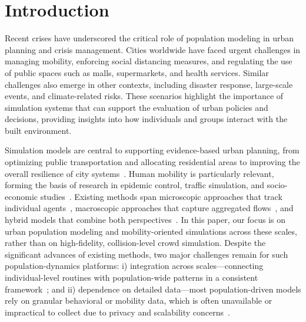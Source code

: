 \documentclass[pdflatex,sn-mathphys-num]{sn-jnl}%
\newcommand\redb[1]{#1}
\theoremstyle{thmstyleone}%
\theoremstyle{thmstyletwo}%
\theoremstyle{thmstylethree}%
\begin{document}
\section{Introduction}
\label{sec:introduction}

Recent crises have underscored the critical role of population modeling in urban planning and crisis management. Cities worldwide have faced urgent challenges in managing mobility, enforcing social distancing measures, and regulating the use of public spaces such as malls, supermarkets, and health services\citep{shafiri2020covidImpact, kang2021hybridCovid, bouchnita2021mathModelCovid}. Similar challenges also emerge in other contexts, including disaster response, large-scale events, and climate-related risks\citep{eid1980, tekouabou2022MLinUrbanPlanning, haraguchi2022mobilityDataReview, serana2023multilevelmodeling}. These scenarios highlight the importance of simulation systems that can \redb{support the evaluation of urban policies and decisions}, providing insights into how individuals and groups interact with the built
environment\citep{kang2021hybridCovid, tekouabou2022MLinUrbanPlanning}.

Simulation models are central to supporting evidence-based urban planning, from optimizing public transportation and allocating residential areas to improving the overall resilience of city systems~\citep{eid1980, tekouabou2022MLinUrbanPlanning}. Human mobility is particularly relevant, forming the basis of research in epidemic control, traffic simulation, and socio-economic studies~\citep{haraguchi2022mobilityDataReview, serana2023multilevelmodeling}. Existing methods span microscopic approaches that track individual agents~\citep{helbing1995social, cao2021competitiveCooperative, khan2024heterogeneousSurvey, ruprecht2024adaptiveMovement}, macroscopic approaches that capture aggregated flows~\citep{hughes2002continuum, treuille2006continuum,thalmann2007crowd}, and hybrid models that combine both perspectives~\citep{xiong2010hybrid, ijaz2015hybridSurvey, antonitsch2019bioclouds, dang2023multilevelCrowd}. 
\redb{In this paper, our focus is on urban population modeling and mobility-oriented simulations across these scales, rather than on high-fidelity, collision-level crowd simulation.} Despite the significant advances of existing methods, two major challenges remain for such population-dynamics platforms: i) integration across scales—connecting individual-level routines with population-wide patterns in a consistent framework~\citep{cogo2019integrability, alessandretti2020nature}; and ii) dependence on detailed data—most population-driven models rely on granular behavioral or mobility data, which is often unavailable or impractical to collect due to privacy and scalability concerns~\citep{cogo2019integrability, alessandretti2020nature}.
\end{document}
